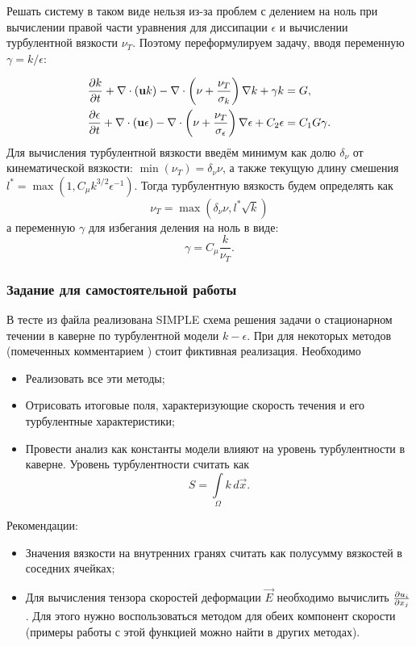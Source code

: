 Решать систему в таком виде нельзя из-за проблем с делением на ноль при вычислении правой части уравнения для диссипации $\epsilon$ и вычислении турбулентной вязкости $\nu_T$.
Поэтому переформулируем задачу, вводя переменную $\gamma = k/\epsilon$:

\begin{align*}
&\frac{\partial k}{\partial t} + \nabla\cdot(\boldsymbol{\rm u} k) - \nabla \cdot \left(\nu + \frac{\nu_T}{\sigma_k}\right)\nabla k + \gamma k = G, \\
&\frac{\partial \epsilon}{\partial t} + \nabla\cdot(\boldsymbol{\rm u} \epsilon) - \nabla \cdot \left(\nu + \frac{\nu_T}{\sigma_\epsilon}\right)\nabla \epsilon + C_2 \epsilon = 
	C_1 G \gamma.
\end{align*}
Для вычисления турбулентной вязкости введём минимум как долю $\delta_\nu$ от кинематической вязкости: $\min(\nu_T) = \delta_\nu \nu$,
а также текущую длину смешения $l^* = \max(1, C_\mu k ^{3/2} \epsilon^{-1})$.
Тогда турбулентную вязкость будем определять как
\begin{equation*}
\nu_T = \max(\delta_\nu \nu, l^* \sqrt k)
\end{equation*}
а переменную $\gamma$ для избегания деления на ноль в виде:
\begin{equation*}
\gamma = C_\mu \frac{k}{\nu_T}.
\end{equation*}


\subsubsection{Задание для самостоятельной работы}
В тесте  из файла 
реализована SIMPLE схема решения задачи о стационарном течении в каверне
по турбулентной модели $k-\epsilon$. При для некоторых методов (помеченных комментарием )
стоит фиктивная реализация.
Необходимо
\begin{itemize}
\item Реализовать все эти методы;
\item Отрисовать итоговые поля, характеризующие скорость течения и его турбулентные характеристики;
\item Провести анализ как константы модели влияют на уровень турбулентности в каверне. Уровень турбулентности
      считать как
\begin{equation*}
S = \int\limits_\Omega k \, d\vec x.
\end{equation*}
\end{itemize}

Рекомендации:
\begin{itemize}
\item Значения вязкости на внутренних гранях считать как полусумму вязкостей в соседних ячейках;
\item Для вычисления тензора скоростей деформации $\vec E$ необходимо вычислить $\frac{\partial u_i}{\partial x_j}$.
Для этого нужно воспользоваться методом  для обеих компонент скорости (примеры работы с этой функцией можно найти в других методах).
\end{itemize}
